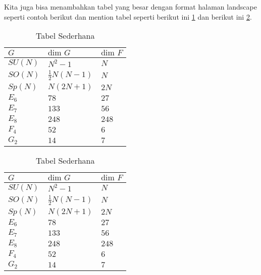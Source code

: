 Kita juga bisa menambahkan tabel yang besar dengan format halaman landscape seperti contoh berikut dan mention tabel seperti berikut ini \cref{tab:landscape} dan berikut ini \cref{tab:tabelx}.
\begin{sidewaysfigure}[htbp]
	\begin{table}[H]
		\caption{Tabel Sederhana}
		\label{tab:landscape}
		\begin{center}
			\begin{tabularx}{0.8\textwidth} {
					|>{\raggedright\arraybackslash}X
					|>{\raggedright\arraybackslash}X
					|>{\raggedright\arraybackslash}X
					|}
				\hline
				$G$     & $\text{dim }G$      & $\text{dim }F$ \\
				\hline
				$SU(N)$ & $N^2 -1$            & $N$            \\
				$SO(N)$ & $\frac{1}{2}N(N-1)$ & $N$            \\
				$Sp(N)$ & $N(2N+1)$           & $2N$           \\
				$E_6$   & $78$                & $27$           \\
				$E_7$   & $133$               & $56$           \\
				$E_8$   & $248$               & $248$          \\
				$F_4$   & $52$                & $6$            \\
				$G_2$   & $14$                & $7$            \\
				\hline
			\end{tabularx}
		\end{center}
	\end{table}
\end{sidewaysfigure}

\begin{table}[H]
	\caption{Tabel Sederhana}
	\label{tab:tabelx}
	\begin{center}
		\begin{tabularx}{0.8\textwidth} {
				|>{\raggedright\arraybackslash}X
				|>{\raggedright\arraybackslash}X
				|>{\raggedright\arraybackslash}X
				|}
			\hline
			$G$     & $\text{dim }G$      & $\text{dim }F$ \\
			\hline
			$SU(N)$ & $N^2 -1$            & $N$            \\
			$SO(N)$ & $\frac{1}{2}N(N-1)$ & $N$            \\
			$Sp(N)$ & $N(2N+1)$           & $2N$           \\
			$E_6$   & $78$                & $27$           \\
			$E_7$   & $133$               & $56$           \\
			$E_8$   & $248$               & $248$          \\
			$F_4$   & $52$                & $6$            \\
			$G_2$   & $14$                & $7$            \\
			\hline
		\end{tabularx}
	\end{center}
\end{table}

